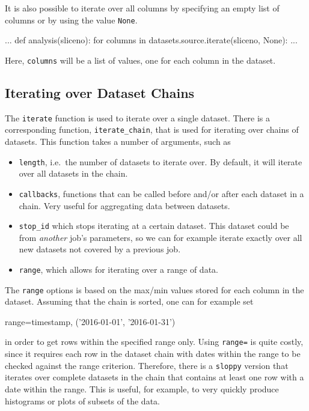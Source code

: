 It is also possible to iterate over all columns by specifying an empty
list of columns or by using the value \texttt{None}.
\begin{python}
...
def analysis(sliceno):
    for columns in datasets.source.iterate(sliceno, None):
        ...
\end{python}
Here, \texttt{columns} will be a list of values, one for each column
in the dataset.


\subsection{Iterating over Dataset Chains}

The \texttt{iterate} function is used to iterate over a single
dataset.  There is a corresponding function, \texttt{iterate\_chain},
that is used for iterating over chains of datasets.  This function
takes a number of arguments, such as
\begin{itemize}
\item[] \texttt{length}, i.e.\ the number of datasets to iterate over.
  By default, it will iterate over all datasets in the chain.
\item[] \texttt{callbacks}, functions that can be called before and/or
  after each dataset in a chain.  Very useful for aggregating data
  between datasets.
\item[] \texttt{stop\_id} which stops iterating at a certain dataset.
  This dataset could be from \textsl{another} job's parameters, so we
  can for example iterate exactly over all new datasets not covered by
  a previous job.
\item[] \texttt{range}, which allows for iterating over a range of
  data.
\end{itemize}
The \texttt{range} options is based on the max/min values stored for
each column in the dataset.  Assuming that the chain is sorted, one
can for example set
\begin{python}
  range={timestamp, ('2016-01-01', '2016-01-31')}
\end{python}
in order to get rows within the specified range only.  Using
\texttt{range=} is quite costly, since it requires each row in the
dataset chain with dates within the range to be checked against the
range criterion.  Therefore, there is a \texttt{sloppy} version that
iterates over complete datasets in the chain that contains at least
one row with a date within the range.  This is useful, for example, to
very quickly produce histograms or plots of subsets of the data.



